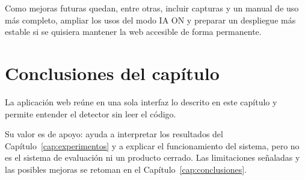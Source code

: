 Como mejoras futuras quedan, entre otras, incluir capturas y un manual de uso más completo, ampliar los usos del modo IA ON y preparar un despliegue más estable si se quisiera mantener la web accesible de forma permanente.

\section{Conclusiones del capítulo}
\label{sec:web_conclusion}

La aplicación web reúne en una sola interfaz lo descrito en este capítulo y permite entender el detector sin leer el código.

Su valor es de apoyo: ayuda a interpretar los resultados del Capítulo~\ref{cap:experimentos} y a explicar el funcionamiento del sistema, pero no es el sistema de evaluación ni un producto cerrado. Las limitaciones señaladas y las posibles mejoras se retoman en el Capítulo~\ref{cap:conclusiones}.
